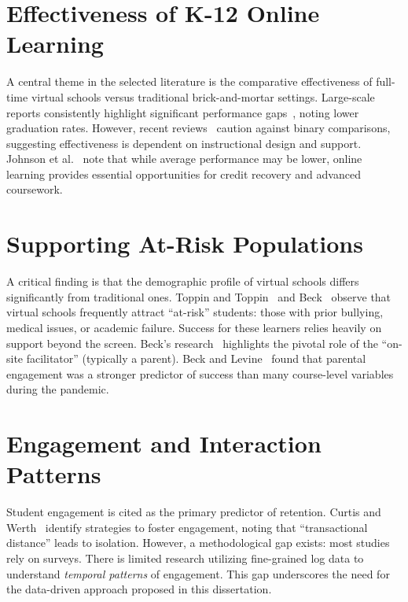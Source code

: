 \section{Effectiveness of K-12 Online Learning}
\label{sec:effectiveness}
A central theme in the selected literature is the comparative effectiveness of full-time virtual schools versus traditional brick-and-mortar settings.
Large-scale reports consistently highlight significant performance gaps~\cite{molnar_virtual_2023}, noting lower graduation rates.
However, recent reviews~\cite{martin_systematic_2020, online_johnson_2022} caution against binary comparisons, suggesting effectiveness is dependent on instructional design and support.
Johnson et al.~\cite{online_johnson_2022} note that while average performance may be lower, online learning provides essential opportunities for credit recovery and advanced coursework.

\section{Supporting At-Risk Populations}
\label{sec:at-risk}
A critical finding is that the demographic profile of virtual schools differs significantly from traditional ones.
Toppin and Toppin~\cite{virtual_toppin_2016} and Beck~\cite{beck_prepared_2023} observe that virtual schools frequently attract ``at-risk'' students: those with prior bullying, medical issues, or academic failure.
Success for these learners relies heavily on support beyond the screen.
Beck's research~\cite{beck_advocate_2020, beck_atrisk_2024} highlights the pivotal role of the ``on-site facilitator'' (typically a parent).
Beck and Levine~\cite{beck_advocate_2020} found that parental engagement was a stronger predictor of success than many course-level variables during the pandemic.

\section{Engagement and Interaction Patterns}
\label{sec:engagement}
Student engagement is cited as the primary predictor of retention.
Curtis and Werth~\cite{fostering_curtis_2015} identify strategies to foster engagement, noting that ``transactional distance'' leads to isolation.
However, a methodological gap exists: most studies rely on surveys.
There is limited research utilizing fine-grained log data to understand \textit{temporal patterns} of engagement.
This gap underscores the need for the data-driven approach proposed in this dissertation.


